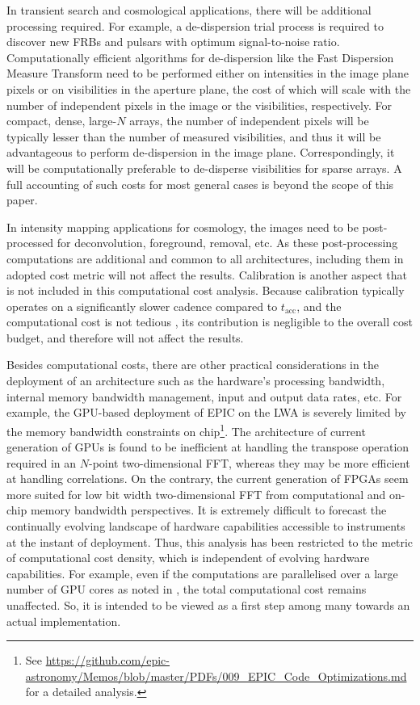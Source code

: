 \documentclass[
  journal=pasa,
  manuscript=article-type,
  year=2020,
  volume=37,
]{cup-journal}
\begin{document}
In transient search and cosmological applications, there will be additional processing required. For example, a de-dispersion trial process is required to discover new FRBs and pulsars with optimum signal-to-noise ratio. Computationally efficient algorithms for de-dispersion like the Fast Dispersion Measure Transform \citep[FDMT;][]{Zackay+2014} need to be performed either on intensities in the image plane pixels or on visibilities in the aperture plane, the cost of which will scale with the number of independent pixels in the image or the visibilities, respectively. For compact, dense, large-$N$ arrays, the number of independent pixels will be typically lesser than the number of measured visibilities, and thus it will be advantageous to perform de-dispersion in the image plane. Correspondingly, it will be computationally preferable to de-disperse visibilities for sparse arrays. A full accounting of such costs for most general cases is beyond the scope of this paper.

In intensity mapping applications for cosmology, the images need to be post-processed for deconvolution, foreground, removal, etc. As these post-processing computations are additional and common to all architectures, including them in adopted cost metric will not affect the results. Calibration is another aspect that is not included in this computational cost analysis. Because calibration typically operates on a significantly slower cadence compared to $t_\textrm{acc}$, and the computational cost is not tedious \citep{Beardsley+2017,Gorthi+2021}, its contribution is negligible to the overall cost budget, and therefore will not affect the results.

Besides computational costs, there are other practical considerations in the deployment of an architecture such as the hardware's processing bandwidth, internal memory bandwidth management, input and output data rates, etc. For example, the GPU-based deployment of EPIC on the LWA is severely limited by the memory bandwidth constraints on chip\footnote{See \url{https://github.com/epic-astronomy/Memos/blob/master/PDFs/009_EPIC_Code_Optimizations.md} for a detailed analysis.}. The architecture of current generation of GPUs is found to be inefficient at handling the transpose operation required in an $N$-point two-dimensional FFT, whereas they may be more efficient at handling correlations. On the contrary, the current generation of FPGAs seem more suited for low bit width two-dimensional FFT from computational and on-chip memory bandwidth perspectives. It is extremely difficult to forecast the continually evolving landscape of hardware capabilities accessible to instruments at the instant of deployment. Thus, this analysis has been restricted to the metric of computational cost density, which is independent of evolving hardware capabilities. For example, even if the computations are parallelised over a large number of GPU cores as noted in \citet{Sokolowski+2024}, the total computational cost remains unaffected. So, it is intended to be viewed as a first step among many towards an actual implementation. 
\end{document}
